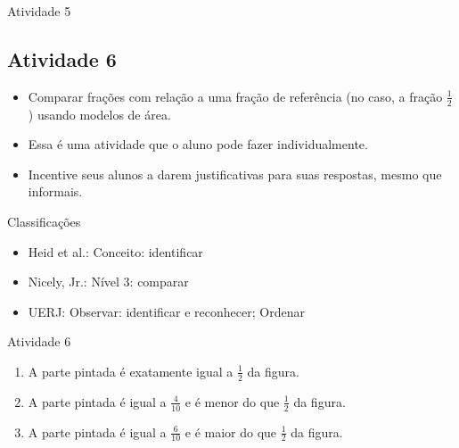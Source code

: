 \begin{multicols}{2}
\begin{resposta*}{Atividade 5}
\end{resposta*}

\subsection{Atividade 6}

  \vspace{.1cm}
  
\begin{itemize} %
    \item       Comparar frações com relação a uma fração de referência (no caso, a fração       $\frac{1}{2}$      ) usando modelos de área.
\end{itemize} %


  \vspace{.1cm} 
  
  \vspace{.1cm}

  \begin{itemize} %
    \item       Essa é uma atividade que o aluno pode fazer individualmente.
    \item       Incentive seus alunos a darem justificativas para suas respostas, mesmo que informais.
\end{itemize} %


  Classificações
\begin{itemize} %
    \item       Heid et al.: Conceito: identificar
    \item       Nicely, Jr.: Nível 3: comparar
    \item       UERJ: Observar: identificar e reconhecer; Ordenar
\end{itemize} %

\begin{resposta*}{Atividade 6}
\begin{enumerate} [\quad a)] %
    \item       A parte pintada é exatamente igual a       $\frac{1}{2}$       da figura.
    \item       A parte pintada é igual a       $\frac{4}{10}$       e é menor do que       $\frac{1}{2}$       da figura.
    \item       A parte pintada é igual a       $\frac{6}{10}$       e é maior do que       $\frac{1}{2}$       da figura.
\end{enumerate} %


\end{resposta*}
\end{multicols}
